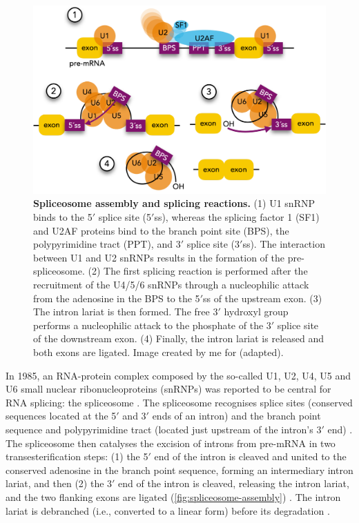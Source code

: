 \begin{figure}[!b]
  \vspace{-\intextsep}
  \centering
  \includegraphics[width=.6\linewidth]{images/intro/spliceosome-assembly}
  \vspace{-.8\intextsep}
  \caption[Spliceosome assembly and splicing reactions]{\textbf{Spliceosome assembly and splicing reactions.} (1) U1 snRNP binds to the 5$'$ splice site (5$'$ss), whereas the splicing factor 1 (SF1) and U2AF proteins bind to the branch point site (BPS), the polypyrimidine tract (PPT), and 3$'$ splice site (3$'$ss). The interaction between U1 and U2 snRNPs results in the formation of the pre-spliceosome. (2) The first splicing reaction is performed after the recruitment of the U4/5/6 snRNPs through a nucleophilic attack from the adenosine in the BPS to the 5$'$ss of the upstream exon. (3) The intron lariat is then formed. The free 3$'$ hydroxyl group performs a nucleophilic attack to the phosphate of the 3$'$ splice site of the downstream exon. (4) Finally, the intron lariat is released and both exons are ligated. Image created by me for \cite{gallego-paez:2017wc} (adapted).}
  \label{fig:spliceosome-assembly}
\end{figure}

In 1985, an RNA-protein complex composed by the so-called U1, U2, U4, U5 and U6 small nuclear ribonucleoproteins (snRNPs) was reported to be central for RNA splicing: the spliceosome \cite{grabowski:1985vm}. The spliceosome recognises splice sites (conserved sequences located at the 5$'$ and 3$'$ ends of an intron) and the branch point sequence and polypyrimidine tract (located just upstream of the intron's 3$'$ end) \cite{mount:1982tu,black:1985ul}. The spliceosome then catalyses the excision of introns from pre-mRNA in two transesterification steps: (1) the 5$'$ end of the intron is cleaved and united to the conserved adenosine in the branch point sequence, forming an intermediary intron lariat, and then (2) the 3$'$ end of the intron is cleaved, releasing the intron lariat, and the two flanking exons are ligated (\autoref{fig:spliceosome-assembly}) \cite{grabowski:1985vm,ruskin:1985vl,horowitz:1993wq}. The intron lariat is debranched (i.e., converted to a linear form) before its degradation \cite{ruskin:1985vl,arenas:1987vc}.

